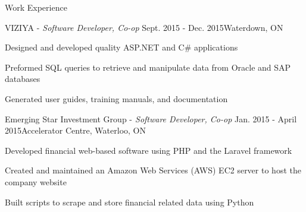 \documentclass{resume}
\begin{document}
\begin{rSection}{Work Experience}
\begin{rSubsection}{VIZIYA -\em{ Software Developer, Co-op}}
{Sept. 2015 - Dec. 2015}{Waterdown, ON}{ }
\item Designed and developed quality ASP.NET and C\# applications
\item Preformed SQL queries to retrieve and manipulate data from Oracle and SAP databases
\item Generated user guides, training manuals, and documentation
\end{rSubsection}

\begin{rSubsection}{Emerging Star Investment Group -\em{ Software Developer, Co-op}}
{Jan. 2015 - April 2015}{Accelerator Centre, Waterloo, ON}{ }
\item Developed financial web-based software using PHP and the Laravel framework
\item Created and maintained an Amazon Web Services (AWS) EC2 server to host the company website
\item Built scripts to scrape and store financial related data using Python
\end{rSubsection}

\end{rSection}
\end{document}
